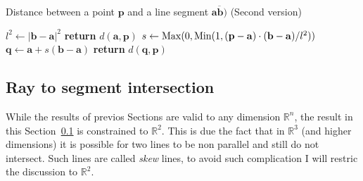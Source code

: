 {\centering
\begin{minipage}{\linewidth}
  \begin{algorithm}[H]
    \caption{Distance between a point $\mathbf{p}$ and a line segment $\overline{\mathbf{a}\mathbf{b})}$  (Second version)}
    \label{alg:poin2seg2}
    \begin{algorithmic}[1] %
       
        \State $l^2 \gets |\mathbf{b} - \mathbf{a}|^2$
         
          \State \textbf{return} $d(\mathbf{a},\mathbf{p})$
        \EndIf
        \State $s \gets \operatorname{Max}(0, \operatorname{Min}(1, (\mathbf{p}-\mathbf{a})\cdot(\mathbf{b}-\mathbf{a}) / l^2))$ 
        \State $\mathbf{q} \gets \mathbf{a} + s (\mathbf{b} - \mathbf{a})$
        \State \textbf{return} $d(\mathbf{q},\mathbf{p})$
      \EndProcedure
    \end{algorithmic}
  \end{algorithm}
\end{minipage}
\par
}

{\centering
\begin{minipage}{\linewidth}
\end{minipage}
\par
}

\subsection{Ray to segment intersection}
\label{sec:ray2segment}
While the results of previos Sections are valid to any dimension $\mathbb{R}^n$, the result in this Section~\ref{sec:ray2segment} is constrained to $\mathbb{R}^2$.
This is due the fact that in $\mathbb{R}^3$ (and higher dimensions) it is possible for two lines to be non parallel and still do not intersect.
Such lines are called \emph{skew} lines, to avoid such complication I will restric the discussion to $\mathbb{R}^2$.

